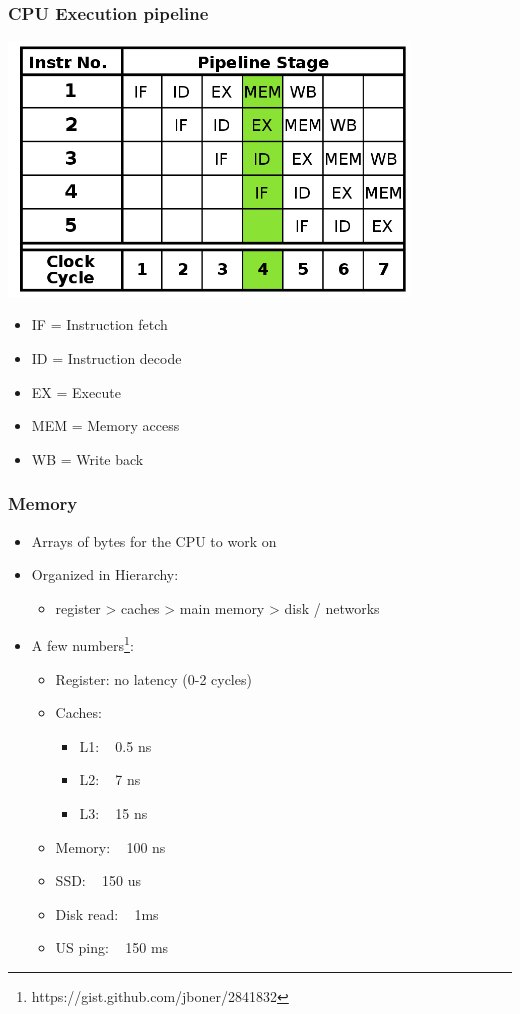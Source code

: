\begin{frame}
  \frametitle{CPU Execution pipeline}

  \begin{center}
    \includegraphics[width=0.8\textwidth,height=0.4\textheight,keepaspectratio]{img/cpu_pipeline.png}
  \end{center}


  \begin{itemize}
  \item IF = Instruction fetch
  \item ID = Instruction decode
  \item EX = Execute
  \item MEM = Memory access
  \item WB = Write back
  \end{itemize}
\end{frame}



\begin{frame}
  \frametitle{Memory}

  \begin{itemize}
  \item Arrays of bytes for the CPU to work on
  \item Organized in Hierarchy:
    \begin{itemize}
    \item register > caches > main memory > disk / networks
    \end{itemize}
  \item A few numbers\footnote{https://gist.github.com/jboner/2841832}:
    \begin{itemize}
    \item Register: no latency (0-2 cycles)
    \item Caches:
      \begin{itemize}
      \item L1: ~ 0.5 ns
      \item L2: ~ 7 ns
      \item L3: ~ 15 ns
      \end{itemize}
    \item Memory: ~ 100 ns
    \item SSD: ~ 150 us
    \item Disk read: ~ 1ms
    \item US ping: ~ 150 ms
    \end{itemize}
  \end{itemize}
\end{frame}

